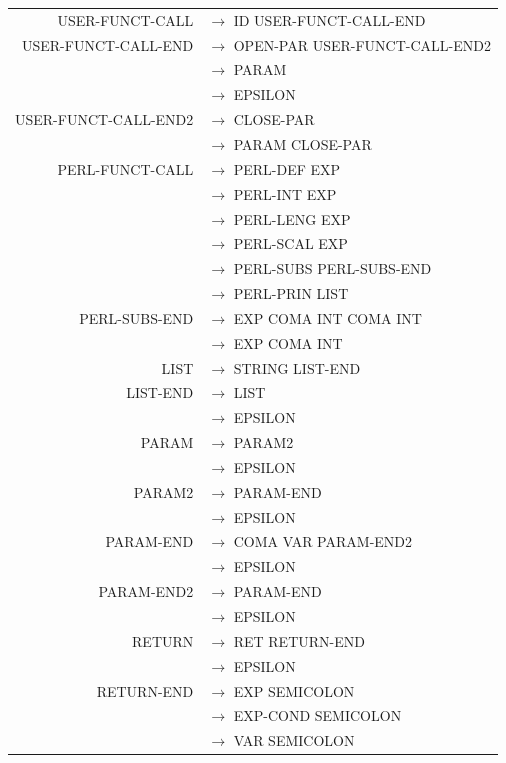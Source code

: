 \documentclass[a4paper,10pt]{article}
\begin{document}
\begin{tabular}{rl}
USER-FUNCT-CALL		& $\rightarrow$ ID USER-FUNCT-CALL-END\\ 

USER-FUNCT-CALL-END	& $\rightarrow$ OPEN-PAR USER-FUNCT-CALL-END2\\ 
					& $\rightarrow$ PARAM\\ 
					& $\rightarrow$ EPSILON\\
					
USER-FUNCT-CALL-END2& $\rightarrow$ CLOSE-PAR\\ 
					& $\rightarrow$ PARAM CLOSE-PAR\\ 

				
PERL-FUNCT-CALL		& $\rightarrow$ PERL-DEF EXP \\
					& $\rightarrow$ PERL-INT EXP \\
					& $\rightarrow$ PERL-LENG EXP \\ 
					& $\rightarrow$ PERL-SCAL EXP \\
					& $\rightarrow$ PERL-SUBS PERL-SUBS-END \\
					& $\rightarrow$ PERL-PRIN LIST \\ 
					
PERL-SUBS-END		& $\rightarrow$ EXP COMA INT COMA INT \\
					& $\rightarrow$ EXP COMA INT  \\
					
LIST				& $\rightarrow$ STRING LIST-END\\
					
LIST-END			& $\rightarrow$ LIST\\
					& $\rightarrow$ EPSILON\\
				

					
PARAM				& $\rightarrow$ PARAM2\\
					& $\rightarrow$ EPSILON \\

PARAM2				& $\rightarrow$ PARAM-END\\
					& $\rightarrow$ EPSILON \\
					
					
PARAM-END			& $\rightarrow$ COMA VAR PARAM-END2\\ 
					& $\rightarrow$ EPSILON \\
					
PARAM-END2			& $\rightarrow$ PARAM-END\\ 
					& $\rightarrow$ EPSILON \\

RETURN				& $\rightarrow$ RET RETURN-END\\
					& $\rightarrow$ EPSILON \\

RETURN-END			& $\rightarrow$ EXP SEMICOLON\\
					& $\rightarrow$ EXP-COND SEMICOLON\\
					& $\rightarrow$ VAR SEMICOLON\\

					
					
					



					
					
\end{tabular}
\end{document}
